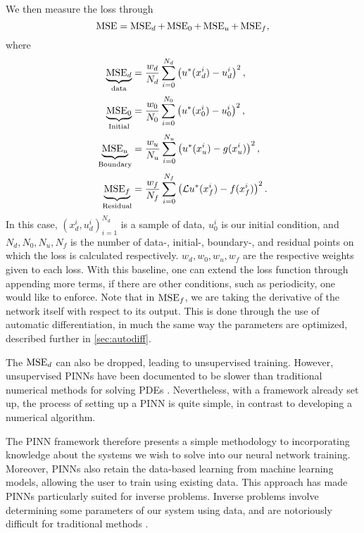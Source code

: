 We then measure the loss through
\begin{equation}\label{eq:PINNMSE}
    \operatorname{MSE} = \operatorname{MSE}_d + \operatorname{MSE}_0 + \operatorname{MSE}_u + \operatorname{MSE}_f,
\end{equation}
where
\begin{equation*}
\begin{split}
    \underbrace{\operatorname{MSE}_d}_{\text{data}} &= \frac{w_d}{N_d} \sum_{i = 0}^{N_d} \left( u^*(x_d^i) - u_d^i \right)^2,  \\
    \underbrace{\operatorname{MSE}_0}_{\text{Initial}} &= \frac{w_0}{N_0} \sum_{i = 0}^{N_0} \left( u^*(x_0^i) - u_0^i \right)^2,  \\
    \underbrace{\operatorname{MSE}_u}_{\text{Boundary}} &= \frac{w_u}{N_u} \sum_{i = 0}^{N_u} \left( u^*(x_u^i) - g(x_u^i) \right)^2, \\
    \underbrace{\operatorname{MSE}_f}_{\text{Residual}} &= \frac{w_f}{N_f} \sum_{i = 0}^{N_f} \left( \mathcal{L}u^*(x_f^i) - f(x_f^i) \right)^2.
\end{split}
\end{equation*}
In this case, $(x_d^i,u_d^i)_{i=1}^{N_d}$ is a sample of data, $u_0^i$ is our initial condition, and $N_d,N_0,N_u,N_f$ is the number of data-, initial-, boundary-, and residual points on which the loss is calculated respectively. $w_d,w_0,w_u,w_f$ are the respective weights given to each loss. 
With this baseline, one can extend the loss function through appending more terms, if there are other conditions, such as periodicity, one would like to enforce.
Note that in $\operatorname{MSE}_f$, we are taking the derivative of the network itself with respect to its output.
This is done through the use of automatic differentiation, in much the same way the parameters are optimized, described further in \autoref{sec:autodiff}.

The $\operatorname{MSE}_d$ can also be dropped, leading to unsupervised training.
However, unsupervised PINNs have been documented to be slower than traditional numerical methods for solving PDEs \cite{en16124558}.
Nevertheless, with a framework already set up, the process of setting up a PINN is quite simple, in contrast to developing a numerical algorithm.

The PINN framework therefore presents a simple methodology to incorporating knowledge about the systems we wish to solve into our neural network training. 
Moreover, PINNs also retain the data-based learning from machine learning models, allowing the user to train using existing data. 
This approach has made PINNs particularly suited for inverse problems. Inverse problems involve determining some parameters of our system using data, and are notoriously difficult for traditional methods \cite{Jagtap_2022,garay2023physicsinformed}.

